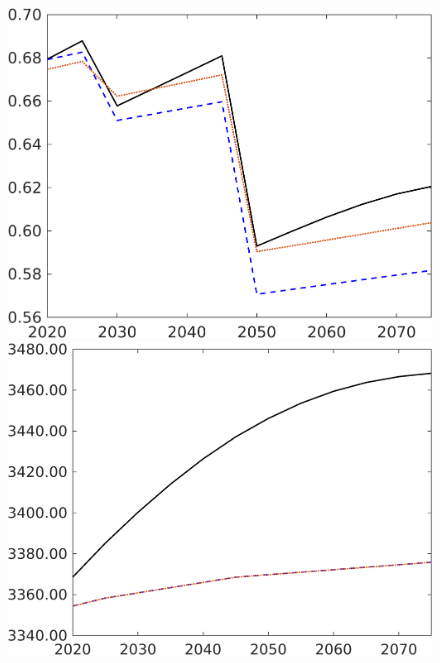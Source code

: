\begin{figure}[h!!]
\begin{minipage}[]{0.32\textwidth}
		\includegraphics[width=1\textwidth]{../../codding_model/own_basedOnFried/optimalPol_elastS_DisuSci/figures/all_1705/C_CompEffOPT_T_NoTaus_spillover0_sep1_BN0_ineq0_red0_etaa0.79_lgd0.png}
	\end{minipage}
	\begin{minipage}[]{0.32\textwidth}
		\includegraphics[width=1\textwidth]{../../codding_model/own_basedOnFried/optimalPol_elastS_DisuSci/figures/all_1705/Af_CompEffOPT_T_NoTaus_spillover0_sep1_BN0_ineq0_red0_etaa0.79_lgd0.png}

\end{minipage}
\end{figure}

